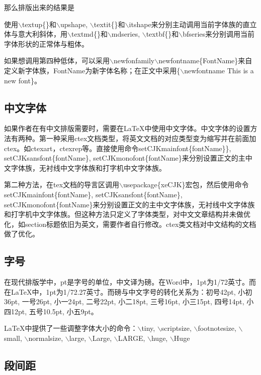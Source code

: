 \documentclass[12pt]{book}
\begin{document}
那么排版出来的结果是


使用$\backslash$textup\{\}和$\backslash$upshape, $\backslash$textit\{\}和$\backslash$itshape来分别主动调用当前字体族的直立体与意大利斜体，用$\backslash$textmd\{\}和$\backslash$mdseries, $\backslash$textbf\{\}和$\backslash$bfseries来分别调用当前字体形状的正常体与粗体。

如果想调用第四种低体，可以采用$\backslash$newfonfamily$\backslash$newfontname\{FontName\}来自定义新字体族，FontName为新字体名称；在正文中采用\{$\backslash$newfontname This is a new font\}。

\subsection{中文字体}

如果作者在有中文排版需要时，需要在\LaTeX{}中使用中文字体。中文字体的设置方法有两种。第一种采用ctex文档类型，将英文文档的对应类型变为缩写并在前面加ctex。如ctexart，ctexrep等。直接使用命令setCJKmainfont\{fontName\}\}, setCJKsansfont\{fontName\}, setCJKmonofont\{fontName\}来分别设置正文的主中文字体族，无衬线中文字体族和打字机中文字体族。

第二种方法，在tex文档的导言区调用$\backslash$usepackage\{xeCJK\}宏包，然后使用命令setCJKmainfont\{fontName\}, setCJKsansfont\{fontName\}, setCJKmonofont\{fontName\}来分别设置正文的主中文字体族，无衬线中文字体族和打字机中文字体族。但这种方法只定义了字体类型，对中文文章结构并未做优化，如section标题依旧为英文，需要作者自行修改。ctex类文档对中文结构的文档做了优化。

\subsection{字号}

在现代排版学中，pt是字号的单位，中文译为磅。在Word中，1pt为1/72英寸。而在LaTeX中，1pt为1/72.27英寸。而磅与中文字号的转化关系为：初号42pt, 小初36pt, 一号26pt, 小一24pt, 二号22pt, 小二18pt, 三号16pt, 小三15pt, 四号14pt, 小四12pt, 五号10.5pt, 小五9pt。

LaTeX中提供了一些调整字体大小的命令：$\backslash$tiny, $\backslash$scriptsize, $\backslash$footnotesize, $\backslash$small, $\backslash$normalsize, $\backslash$large, $\backslash$Large, $\backslash$LARGE, $\backslash$huge, $\backslash$Huge



\subsection{段间距}
\end{document}
